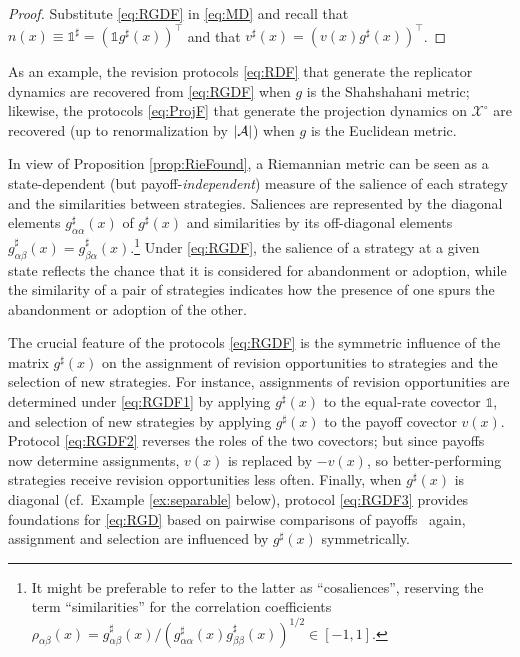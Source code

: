 \documentclass[reqno]{amsart}
\DeclarePairedDelimiter{\abs}{\lvert}{\rvert}
\theoremstyle{plain}
\theoremstyle{definition}
\theoremstyle{remark}
\numberwithin{equation}{section}
\numberwithin{theorem}{section}
\begin{document}
\begin{proof}
Substitute \eqref{eq:RGDF} in \eqref{eq:MD} and recall that ${n}(x) \equiv {\mathds{1}}^{\sharp} = ({\mathds{1}} g^{\sharp}(x))^{\top}$ and that ${v}^{\sharp}(x) =  ({v}(x) g^{\sharp}(x))^{\top}$.
\end{proof}

As an example, the revision protocols \eqref{eq:RDF} that generate the replicator dynamics are recovered from \eqref{eq:RGDF} when $g$ is the Shahshahani metric;
likewise, the protocols \eqref{eq:ProjF} that generate the projection dynamics on ${{\mathcal{X}}^{\circ}}$ are recovered (up to renormalization by $\abs{\mathcal{A}}$) when $g$ is the Euclidean metric.

In view of Proposition \ref{prop:RieFound}, a Riemannian metric can be seen as a state-dependent (but payoff-\emph{independent}) measure of the salience of each strategy and the similarities between strategies.
Saliences are represented by the diagonal elements $g_{\alpha\alpha}^{\sharp}(x)$ of $g^\sharp(x)$ and similarities by its off-diagonal elements $g^\sharp_{\alpha\beta}(x)=g^\sharp_{\beta\alpha}(x)$.\footnote{It might be preferable to refer to the latter as ``cosaliences'', reserving the term ``similarities'' for the correlation coefficients $\rho_{\alpha\beta}(x) = g_{\alpha\beta}^{\sharp}(x)/(g_{\alpha\alpha}^{\sharp}(x) g_{\beta\beta}^{\sharp}(x))^{1/2} \in [-1,1]$.}
Under \eqref{eq:RGDF}, the salience of a strategy at a given state reflects the chance that it is considered for abandonment or adoption, while the similarity of a pair of strategies indicates how the presence of one spurs the abandonment or adoption of the other.

The crucial feature of the protocols \eqref{eq:RGDF} is the symmetric influence of the matrix $g^{\sharp}(x)$ on the assignment of revision opportunities to strategies and the selection of new strategies.
For instance, assignments of revision opportunities are determined under \eqref{eq:RGDF1} by applying $g^{\sharp}(x)$ to the equal-rate covector ${\mathds{1}}$, and selection of new strategies by applying $g^\sharp(x)$ to the payoff covector ${v}(x)$.
Protocol \eqref{eq:RGDF2} reverses the roles of the two covectors;
but since payoffs now determine assignments, ${v}(x)$ is replaced by $-{v}(x)$, so better-performing strategies receive revision opportunities less often.
Finally, when $g^\sharp(x)$ is diagonal (cf.~Example \ref{ex:separable} below), protocol \eqref{eq:RGDF3} provides foundations for \eqref{eq:RGD} based on pairwise comparisons of payoffs \textendash\ again, assignment and selection are influenced by $g^\sharp(x)$ symmetrically.
\end{document}
